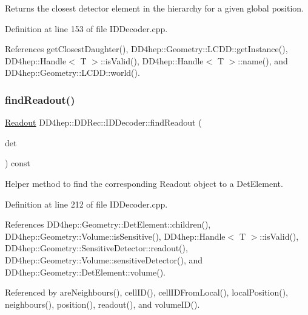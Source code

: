 Returns the closest detector element in the hierarchy for a given global position. 



Definition at line 153 of file I\+D\+Decoder.\+cpp.



References get\+Closest\+Daughter(), D\+D4hep\+::\+Geometry\+::\+L\+C\+D\+D\+::get\+Instance(), D\+D4hep\+::\+Handle$<$ T $>$\+::is\+Valid(), D\+D4hep\+::\+Handle$<$ T $>$\+::name(), and D\+D4hep\+::\+Geometry\+::\+L\+C\+D\+D\+::world().

\hypertarget{class_d_d4hep_1_1_d_d_rec_1_1_i_d_decoder_af87ecd82999db5fe7598179a9a25e8cb}{}\label{class_d_d4hep_1_1_d_d_rec_1_1_i_d_decoder_af87ecd82999db5fe7598179a9a25e8cb} 
\subsubsection{\texorpdfstring{find\+Readout()}{findReadout()}}
{\footnotesize\ttfamily \hyperlink{class_d_d4hep_1_1_geometry_1_1_readout}{Readout} D\+D4hep\+::\+D\+D\+Rec\+::\+I\+D\+Decoder\+::find\+Readout (\begin{DoxyParamCaption}\item[{const \hyperlink{class_d_d4hep_1_1_geometry_1_1_det_element}{Geometry\+::\+Det\+Element} \&}]{det }\end{DoxyParamCaption}) const\hspace{0.3cm}{\ttfamily [protected]}}



Helper method to find the corresponding Readout object to a Det\+Element. 



Definition at line 212 of file I\+D\+Decoder.\+cpp.



References D\+D4hep\+::\+Geometry\+::\+Det\+Element\+::children(), D\+D4hep\+::\+Geometry\+::\+Volume\+::is\+Sensitive(), D\+D4hep\+::\+Handle$<$ T $>$\+::is\+Valid(), D\+D4hep\+::\+Geometry\+::\+Sensitive\+Detector\+::readout(), D\+D4hep\+::\+Geometry\+::\+Volume\+::sensitive\+Detector(), and D\+D4hep\+::\+Geometry\+::\+Det\+Element\+::volume().



Referenced by are\+Neighbours(), cell\+I\+D(), cell\+I\+D\+From\+Local(), local\+Position(), neighbours(), position(), readout(), and volume\+I\+D().

